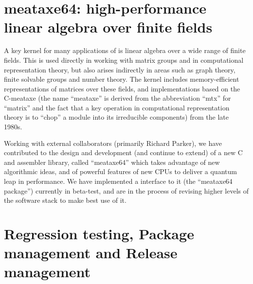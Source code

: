 \documentclass{deliverablereport}
\begin{document}


\section{meataxe64: high-performance linear algebra over finite fields}\label{meataxe64}

A key kernel for many applications of \GAP is linear algebra over
a wide range of finite fields. This is used directly in working with
matrix groups and in computational representation theory, but also
arises indirectly in areas such as graph theory, finite solvable
groups and number theory. The \GAP kernel includes memory-efficient
representations of matrices over these fields, and implementations
based on the C-meataxe (the name ``meataxe'' is derived from the
abbreviation ``mtx'' for ``matrix'' and the fact that a key operation
in computational representation theory is to ``chop'' a module into
its irreducible components) from the late 1980s.

Working with external collaborators (primarily Richard Parker),
we have contributed to the design and development (and continue to extend) of a new C and
assembler library, called ``meataxe64'' which takes
advantage of new algorithmic ideas, and of powerful features of new
CPUs to deliver a quantum leap in performance. We have implemented a
\GAP interface to it (the ``meataxe64 \GAP package'') currently in
beta-test, and are in the
process of revising higher levels of the software stack to make best
use of it.




\section{Regression testing, Package management and Release management}\label{gap-infra}
\end{document}
